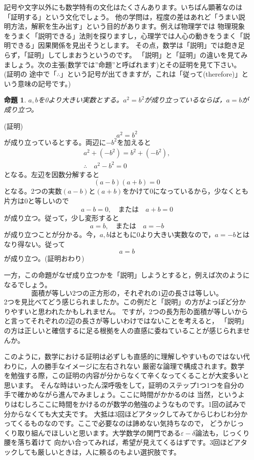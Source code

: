 \documentclass[./main]{subfiles}
\newtheorem{thm}{命題}
\begin{document}
記号や文字以外にも数学特有の文化はたくさんあります。いちばん顕著なのは「証明する」という文化でしょう。
他の学問は，程度の差はあれど「うまい説明方法，解釈を生み出す」という目的があります。例えば物理学では
物理現象をうまく「説明できる」法則を探りますし，心理学では人心の動きをうまく「説明できる」因果関係を見出そうとします。
その点，数学は「説明」では飽き足らず，「証明」してしまおうというのです。
「説明」と「証明」の違いを見てみましょう。次の主張(数学では''命題''と呼ばれます)とその証明を見て下さい。(証明の
途中で「$\therefore$」という記号が出てきますが，これは「従って(therefore)」という意味の記号です。)

\begin{thm}
$a,b$を0より大きい実数とする。$a^2 = b^2$が成り立っているならば，$a = b$が成り立つ。
\end{thm}

(証明)
\[a^2 = b^2 \]
が成り立っているとする。両辺に$-b^2$を加えると
\begin{gather*}
a^2 + (-b^2) = b^2 + (-b^2), \\
\therefore \quad a^2 - b^2 = 0
\end{gather*}
となる。左辺を因数分解すると
\[
(a-b)(a+b) = 0
\]
となる。2つの実数$(a-b)と(a+b)$をかけて0になっているから，少なくとも片方は0と等しいので
\[
a-b=0, \quad または\quad a+b=0
\]
が成り立つ。従って，少し変形すると
\[
a=b, \quad または \quad a=-b
\]
が成り立つことが分かる。今，$a,b$はともに0より大きい実数なので，$a=-b$とはなり得ない。従って
\[
a=b
\]
が成り立つ。(証明おわり)

一方，この命題がなぜ成り立つかを「説明」しようとすると，例えば次のようになるでしょう。
\[
面積が等しい2つの正方形の，それぞれの1辺の長さは等しい。
\]
2つを見比べてどう感じられましたか。この例だと「説明」の方がよっぽど分かりやすいと思われたかもしれません。
ですが，2つの\.{長}\.{方}\.{形}の面積が等しいからと言ってそれぞれの2辺の長さが等しいわけではないことを考えると，
「説明」の方は正しいと確信するに足る根拠を人の直感に委ねていることが感じられませんか。

このように，数学における証明は必ずしも直感的に理解しやすいものではない代わりに，人の勝手なイメージに左右されない
厳密な論理で構成されます。数学を勉強する際，この証明の内容が分からなくて辛くなってくることが大変多いと思います。
そんな時はいったん深呼吸をして，証明のステップ1つ1つを自分の手で確かめながら進んでみましょう。ここに時間がかかるのは
当然，というよりはむしろここに時間をかけるのが数学の勉強のようなものです。1回の試みで分からなくても大丈夫です。
大抵は3回ほどアタックしてみてからじわじわ分かってくるものなのです。ここで必要なのは諦めない気持ちなので，
どうかじっくり取り組んでほしいと思います。大学数学の関門である$\varepsilon-\delta$論法も，じっくり腰を落ち着けて
向かい合ってみれば，希望が見えてくるはずです。3回ほどアタックしても厳しいときは，人に頼るのもよい選択肢です。
\end{document}
